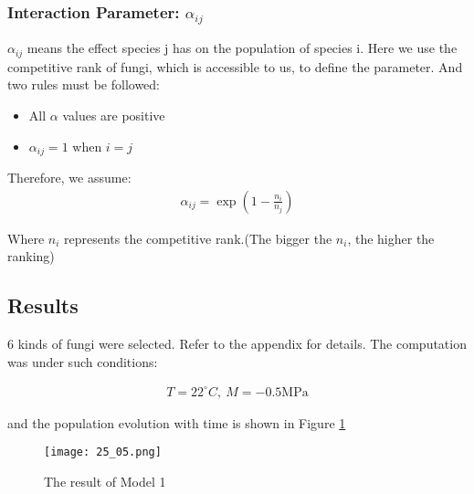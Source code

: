 \subsubsection{Interaction Parameter: $\alpha_{ij}$}

	$\alpha_{ij}$ means the effect species j has on the population of species i. Here we use the competitive rank of fungi, which is accessible to us, to define the parameter. And two rules must be followed:
	\begin{itemize}
		\item All $\alpha$ values are positive
		\item $\alpha_{ij}=1$ when $i=j$
	\end{itemize}

	Therefore, we assume:
	\begin{align}
		\alpha_{ij}=\exp(1-\frac{n_i}{n_j})	
	\end{align}

	Where $n_i$ represents the competitive rank.(The bigger the $n_i$, the higher the ranking)


\subsection{Results}
	6 kinds of fungi were selected. Refer to the appendix for details. 
	The computation was under such conditions:
 
	\begin{align}
    	T=22^{\circ}C,\ M=-0.5\text{MPa}\nonumber   
	\end{align}

	and the population evolution with time is shown in Figure \ref{fig:result1}

	\begin{figure}[H]
    	\centering
	    \texttt{[image: 25\_05.png]}
    	\caption{The result of Model 1}\label{fig:result1}
    \end{figure}